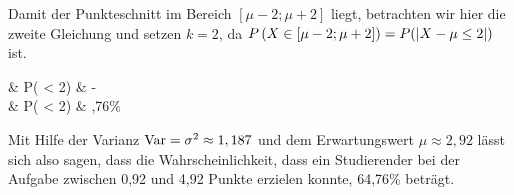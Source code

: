 \documentclass[main.tex]{subfiles}
\begin{document}
Damit der Punkteschnitt im Bereich $[\mu-2; \mu+2]$ liegt, betrachten wir hier die zweite Gleichung und setzen $k=2$, da $P\left(X\in [\mu-2; \mu+2]\right) = P(\abs*{X-\mu \leq 2})$ ist.
\begin{equiveqs}
	& P\left( < 2\right) & -  \\[3mm]
	\equiv & P\left( < 2\right) &\geq {} ,76\% \\
\end{equiveqs}

Mit Hilfe der Varianz $\Var = \sigma^2 \approx 1,187$ und dem Erwartungswert $\mu \approx 2,92$ lässt sich also sagen, dass
die Wahrscheinlichkeit, dass ein Studierender bei der Aufgabe zwischen 0,92 und 4,92 Punkte erzielen konnte, 64,76\% beträgt.
\end{document}
